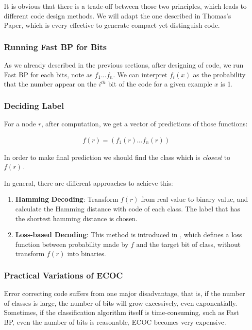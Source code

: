 It is obvious that there is a trade-off between those two principles, which leads to different code design methods. We will adapt the one described in Thomas's Paper\cite{Thomas1995}, which is every effective to generate compact yet distinguish code.

\subsubsection*{Running Fast BP for Bits}

As we already described in the previous sections, after designing of code, we run Fast BP for each bits, note as $f_{1}...f_{n}$. We can interpret $f_{i}(x)$ as the probability that the number appear on the $i^{th}$ bit of the code for a given example $x$ is 1.

\subsubsection*{Deciding Label}

For a node $r$, after computation, we get a vector of predictions of those functions:

\begin{gather*}
    f(r) = (f_{1}(r)...f_{n}(r))
\end{gather*}


In order to make final prediction we should find the class which is \textit{closest} to $f(r)$.

In general, there are different approaches to achieve this:

\begin{enumerate}
    \item \textbf{Hamming Decoding}: Transform $f(r)$ from real-value to binary value, and calculate the Hamming distance with code of each class. The label that has the shortest hamming distance is chosen.
    \item \textbf{Loss-based Decoding}: This method is introduced in \cite{Erin2000}, which defines a loss function between probability made by $f$ and the target bit of class, without transform $f(r)$ into binaries.
\end{enumerate}

\subsubsection*{Practical Variations of ECOC}

Error correcting code suffers from one major disadvantage, that is, if the number of classes is large, the number of bits will grow excessively, even exponentially. Sometimes, if the classification algorithm itself is time-consuming, such as Fast BP, even the number of bits is reasonable, ECOC becomes very expensive.

